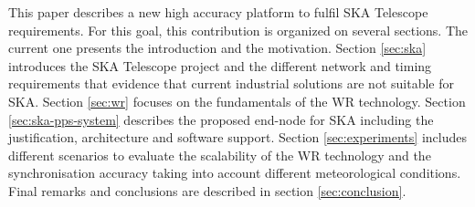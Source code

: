 This paper describes a new high accuracy platform to fulfil SKA Telescope requirements. For this goal, this contribution is organized on several sections. The current one presents the introduction and the motivation. Section \ref{sec:ska} introduces the SKA Telescope project and the different network and timing requirements that evidence that current industrial solutions are not suitable for SKA. Section \ref{sec:wr} focuses on the fundamentals of the WR technology. Section \ref{sec:ska-pps-system} describes the proposed end-node for SKA including the justification, architecture and software support. Section \ref{sec:experiments} includes different scenarios to evaluate the scalability of the WR technology and the synchronisation accuracy taking into account different meteorological conditions. Final remarks and conclusions are described in section \ref{sec:conclusion}. 
